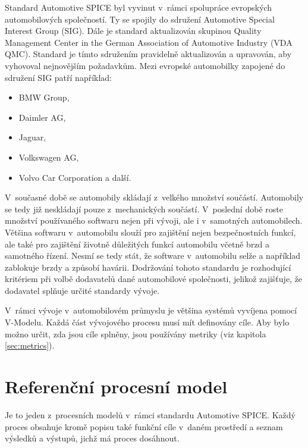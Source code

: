 \documentclass[czech,master]{diploma}
\begin{document}
Standard Automotive SPICE byl vyvinut v~rámci spolupráce evropských automobilových společností. Ty se spojily do sdružení Automotive Special Interest Group (SIG). Dále je standard aktualizován skupinou Quality Management Center in the German Association of Automotive Industry (VDA QMC). Standard je tímto sdružením pravidelně aktualizován a upravován, aby vyhovoval nejnovějším požadavkům. Mezi evropské automobilky zapojené do sdružení SIG patří například:

\begin{itemize}
  \item BMW Group,
  \item Daimler AG,
  \item Jaguar,
  \item Volkswagen AG,
  \item Volvo Car Corporation a další.
\end{itemize}

V~současné době se automobily skládají z~velkého množství součástí. Automobily se tedy již neskládají pouze z~mechanických součástí. V~poslední době roste množství používaného softwaru nejen při vývoji, ale i v~samotných automobilech. Většina softwaru v~automobilu slouží  pro zajištění nejen bezpečnostních funkcí, ale také pro zajištění životně důležitých funkcí automobilu včetně brzd a samotného řízení. Nesmí se tedy stát, že software v~automobilu selže a například zablokuje brzdy a způsobí havárii. Dodržování tohoto standardu je rozhodující kritériem při volbě dodavatelů dané automobilové společnosti, jelikož zajišťuje, že dodavatel splňuje určité standardy vývoje.

V~rámci vývoje v~automobilovém průmyslu je většina systémů vyvíjena pomocí V-Modelu. Každá část  vývojového procesu musí mít definovány cíle. Aby bylo možno určit, zda jsou cíle splněny, jsou používány metriky (viz kapitola \ref{sec:metrics}).

\section{Referenční procesní model}
Je to jeden z~procesních modelů v~rámci standardu Automotive SPICE.
Každý proces obsahuje kromě popisu také funkční cíle v~daném prostředí a seznam výsledků a výstupů, jichž má proces dosáhnout.
\cite{ref:aspice_download_procesni_modely}
\end{document}

